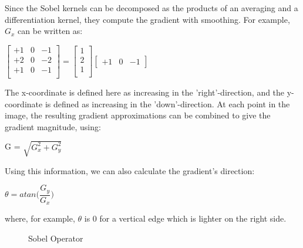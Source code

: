 Since the Sobel kernels can be decomposed as the products of an averaging and a differentiation kernel, they compute the gradient with smoothing. For example, \textbf{$G_{x}$}  can be written as:

\begin{center}
$  \begin{bmatrix}
	+1 & 0 & -1 \\
	+2 & 0 & -2 \\
	+1 & 0 & -1 \\
   \end{bmatrix} =  \begin{bmatrix}
	1 \\
	2 \\
	1 \\
  \end{bmatrix} \begin{bmatrix}
	+1 & 0 & -1
  \end{bmatrix}
$
\end{center}


The x-coordinate is defined here as increasing in the 'right'-direction, and the y-coordinate is defined as increasing in the 'down'-direction. At each point in the image, the resulting gradient approximations can be combined to give the gradient magnitude, using\cite{SobelOperatorandCannyEdgeDetector}:

\begin{center}
G = $\sqrt{ G_{x}^{2} + G_{y}^{2} }$
\end{center}

Using this information, we can also calculate the gradient's direction\cite{SobelOperatorandCannyEdgeDetector}:

\begin{center}
$\theta = atan\bigg(\dfrac{G_{y}}{G_{x}}\bigg)$
\end{center}

where, for example, $\theta$ is 0 for a vertical edge which is lighter on the right side.


\begin{figure}[H]
  \centering
  \hfill
  \caption{Sobel Operator\cite{SobelOperatorandCannyEdgeDetector}}
\end{figure} 


